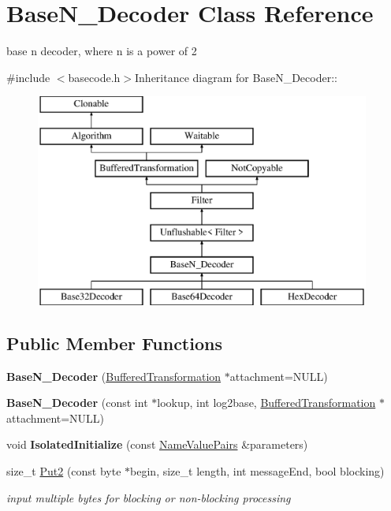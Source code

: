 \hypertarget{class_base_n___decoder}{
\section{BaseN\_\-Decoder Class Reference}
\label{class_base_n___decoder}
}


base n decoder, where n is a power of 2  


{\ttfamily \#include $<$basecode.h$>$}Inheritance diagram for BaseN\_\-Decoder::\begin{figure}[H]
\begin{center}
\leavevmode
\includegraphics[height=7cm]{class_base_n___decoder}
\end{center}
\end{figure}
\subsection*{Public Member Functions}
\begin{DoxyCompactItemize}
\item 
\hypertarget{class_base_n___decoder_a4d109d2956d9184e51ee96efe5f04289}{
{\bfseries BaseN\_\-Decoder} (\hyperlink{class_buffered_transformation}{BufferedTransformation} $\ast$attachment=NULL)}
\label{class_base_n___decoder_a4d109d2956d9184e51ee96efe5f04289}

\item 
\hypertarget{class_base_n___decoder_a21381ad5fe63385d7cd6301391dcc742}{
{\bfseries BaseN\_\-Decoder} (const int $\ast$lookup, int log2base, \hyperlink{class_buffered_transformation}{BufferedTransformation} $\ast$attachment=NULL)}
\label{class_base_n___decoder_a21381ad5fe63385d7cd6301391dcc742}

\item 
\hypertarget{class_base_n___decoder_a7c82c37a6626042f2e0eb65307e039b7}{
void {\bfseries IsolatedInitialize} (const \hyperlink{class_name_value_pairs}{NameValuePairs} \&parameters)}
\label{class_base_n___decoder_a7c82c37a6626042f2e0eb65307e039b7}

\item 
size\_\-t \hyperlink{class_base_n___decoder_a56c46bd846fca139874903d26df4385f}{Put2} (const byte $\ast$begin, size\_\-t length, int messageEnd, bool blocking)
\begin{DoxyCompactList}\small\item\em input multiple bytes for blocking or non-\/blocking processing \item\end{DoxyCompactList}\end{DoxyCompactItemize}
